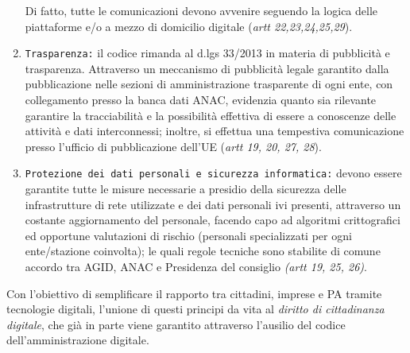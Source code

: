 \documentclass{article}
\begin{document}
\begin{justify}
\begin{enumerate}
        Di fatto, tutte le comunicazioni devono avvenire seguendo la logica delle piattaforme e/o a mezzo di domicilio digitale (\textit{artt 22,23,24,25,29}).
        \item \texttt{Trasparenza:} il codice rimanda al d.lgs 33/2013 in materia di pubblicità e trasparenza. Attraverso un meccanismo di pubblicità legale garantito dalla pubblicazione nelle sezioni di amministrazione trasparente di ogni ente, con collegamento presso la banca dati ANAC, evidenzia quanto sia rilevante garantire la tracciabilità e la possibilità effettiva di essere a conoscenze delle attività e dati interconnessi; inoltre, si effettua una tempestiva comunicazione presso l'ufficio di pubblicazione dell'UE (\textit{artt 19, 20, 27, 28}).
        \item \texttt{Protezione dei dati personali e sicurezza informatica:} devono essere garantite tutte le misure necessarie a presidio della sicurezza delle infrastrutture di rete utilizzate e dei dati personali ivi presenti, attraverso un costante aggiornamento del personale, facendo capo ad algoritmi crittografici ed opportune valutazioni di rischio (personali specializzati per ogni ente/stazione coinvolta); le quali regole tecniche sono stabilite di comune accordo tra AGID, ANAC e Presidenza del consiglio \textit{(artt 19, 25, 26)}.
    \end{enumerate}
    Con l'obiettivo di semplificare il rapporto tra cittadini, imprese e PA tramite tecnologie digitali, l'unione di questi principi da vita al \textit{diritto di cittadinanza digitale}, che già in parte viene garantito attraverso l'ausilio del codice dell'amministrazione digitale.
\end{justify}
\end{document}
